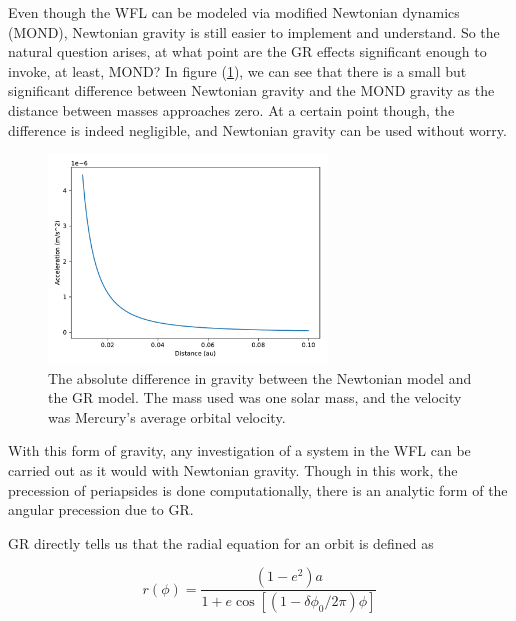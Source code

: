 \documentclass{report}
\begin{document}
            Even though the WFL can be modeled via modified Newtonian dynamics (MOND), Newtonian gravity is still easier to implement and understand.  So the natural question arises, at what point are the GR effects significant enough to invoke, at least, MOND?  In figure (\ref{fig:Newton_GR_Comp}), we can see that there is a small but significant difference between Newtonian gravity and the MOND gravity as the distance between masses approaches zero.  At a certain point though, the difference is indeed negligible, and Newtonian gravity can be used without worry.
        
            \begin{figure}[h]
                \centering
                \includegraphics[width = 0.66\textwidth]{images/Newton_GR_Comp.pdf}
                \caption{The absolute difference in gravity between the Newtonian model and the GR model.  The mass used was one solar mass, and the velocity was Mercury's average orbital velocity.}
                \label{fig:Newton_GR_Comp}
            \end{figure}
            
            With this form of gravity, any investigation of a system in the WFL can be carried out as it would with Newtonian gravity.  Though in this work, the precession of periapsides is done computationally, there is an analytic form of the angular precession due to GR.  
            
            GR directly tells us that the radial equation for an orbit is defined as\cite{MTW}
            
            \begin{equation} \label{eq:GR_radius}
                r(\phi) = \frac{(1 - e^2) a}{1 + e \cos[ (1 - \delta \phi_0 / 2 \pi) \phi]}
            \end{equation}

\pagebreak
            
\end{document}
